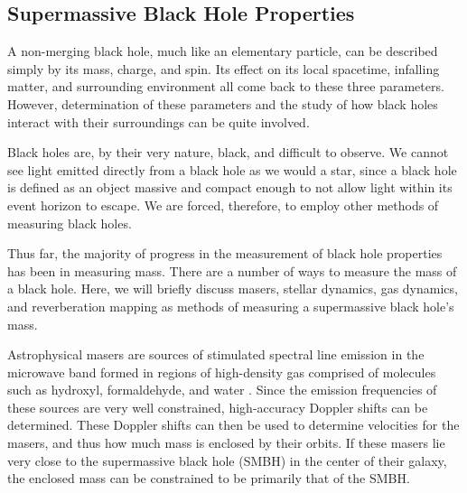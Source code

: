 %



\subsection{Supermassive Black Hole Properties}

A non-merging black hole, much like an elementary particle, can be described simply by its mass, charge, and spin.  Its effect on its local spacetime, infalling matter, and surrounding environment all come back to these three parameters.  However, determination of these parameters and the study of how black holes interact with their surroundings can be quite involved.



Black holes are, by their very nature, black, and difficult to observe.  We cannot see light emitted directly from a black hole as we would a star, since a black hole is defined as an object massive and compact enough to not allow light within its event horizon to escape.  We are forced, therefore, to employ other methods of measuring black holes.

Thus far, the majority of progress in the measurement of black hole properties has been in measuring mass.  There are a number of ways to measure the mass of a black hole.  Here, we will briefly discuss masers, stellar dynamics, gas dynamics, and reverberation mapping as methods of measuring a supermassive black hole's mass.

Astrophysical masers are sources of stimulated spectral line emission in the microwave band formed in regions of high-density gas comprised of molecules such as hydroxyl, formaldehyde, and water \citep{lo_2005}.  Since the emission frequencies of these sources are very well constrained, high-accuracy Doppler shifts can be determined.  These Doppler shifts can then be used to determine velocities for the masers, and thus how much mass is enclosed by their orbits.  If these masers lie very close to the supermassive black hole (SMBH) in the center of their galaxy, the enclosed mass can be constrained to be primarily that of the SMBH.

